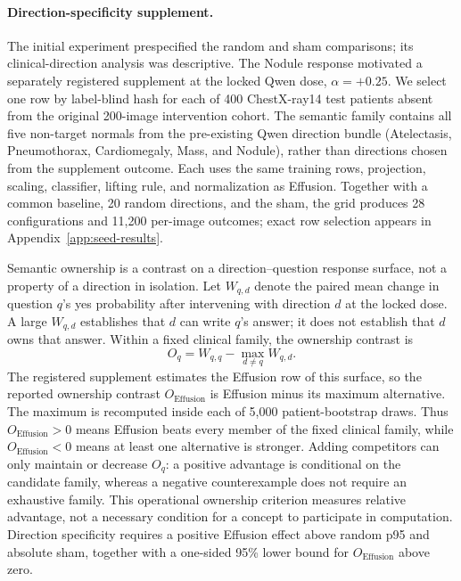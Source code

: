 \documentclass{article}
\begin{document}
\paragraph{Direction-specificity supplement.}
The initial experiment prespecified the random and sham comparisons; its clinical-direction analysis was descriptive. The Nodule response motivated a separately registered supplement at the locked Qwen dose, $\alpha=+0.25$. We select one row by label-blind hash for each of 400 ChestX-ray14 test patients absent from the original 200-image intervention cohort. The semantic family contains all five non-target normals from the pre-existing Qwen direction bundle (Atelectasis, Pneumothorax, Cardiomegaly, Mass, and Nodule), rather than directions chosen from the supplement outcome. Each uses the same training rows, projection, scaling, classifier, lifting rule, and normalization as Effusion. Together with a common baseline, 20 random directions, and the sham, the grid produces 28 configurations and 11,200 per-image outcomes; exact row selection appears in Appendix~\ref{app:seed-results}.

Semantic ownership is a contrast on a direction--question response surface, not a property of a direction in isolation. Let $W_{q,d}$ denote the paired mean change in question $q$'s yes probability after intervening with direction $d$ at the locked dose. A large $W_{q,d}$ establishes that $d$ can write $q$'s answer; it does not establish that $d$ owns that answer. Within a fixed clinical family, the ownership contrast is
\begin{equation}
O_q=W_{q,q}-\max_{d\neq q}W_{q,d}.
\label{eq:seed-margin}
\end{equation}
The registered supplement estimates the Effusion row of this surface, so the reported ownership contrast $O_{\mathrm{Effusion}}$ is Effusion minus its maximum alternative. The maximum is recomputed inside each of 5,000 patient-bootstrap draws. Thus $O_{\mathrm{Effusion}}>0$ means Effusion beats every member of the fixed clinical family, while $O_{\mathrm{Effusion}}<0$ means at least one alternative is stronger. Adding competitors can only maintain or decrease $O_q$: a positive advantage is conditional on the candidate family, whereas a negative counterexample does not require an exhaustive family. This operational ownership criterion measures relative advantage, not a necessary condition for a concept to participate in computation. Direction specificity requires a positive Effusion effect above random p95 and absolute sham, together with a one-sided 95\% lower bound for $O_{\mathrm{Effusion}}$ above zero.
\end{document}
